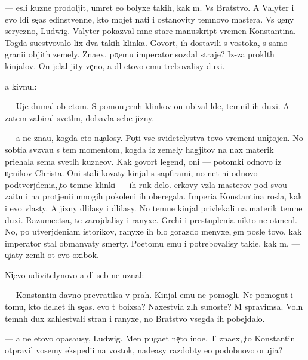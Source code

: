 \documentclass[10pt]{book}
\begin{document}
— {\Y}esli kuzne{\q} prodoljit, umret {\y}e{\x}o bolyxe takih, kak m{\yi}. Vs{\e} Bratstvo. A Valyter i {\y}evo l{\iu}di se{\y}{\c}as {\y}edinstvenn{\yi}{\y}e, kto mojet na{\y}ti i ostanovity temnovo mastera. Vs{\e} o{\c}eny seryezno, Ludwig. Valyter pokaz{\yi}val mne star{\yi}{\y}e manuskript{\yi} vremen Konstantina. Togda su{\x}estvovalo lix dva takih klinka. Govor{\ia}t, ih dostavili s vostoka, s samo{\y} grani{\q}i objit{\yi}h zemely. Zna{\y}ex, po{\c}emu imperator sozdal straje{\y}? Iz-za prokl{\ia}t{\yi}h kinjalov. On jelal jity ve{\c}no, a dl{\ia} etovo {\y}emu trebovalisy duxi.

{\Y}a kivnul:

— Uje dumal ob etom. S pomo{\x}{\y}u {\c}ern{\yi}h klinkov on ubival l{\iu}de{\y}, temnil ih duxi. A zatem zabiral svetl{\yi}m, dobavl{\ia}{\y}a sebe jizny.

— {\Y}a ne zna{\y}u, kogda eto na{\c}alosy. Po{\c}ti vse svidetelystva tovo vremeni uni{\c}tojen{\yi}. No sob{\yi}ti{\y}a sv{\ia}z{\yi}va{\y}u s tem momentom, kogda iz zemely hagjitov na nax materik pri{\y}ehala sem{\y}a svetl{\yi}h kuzne{\q}ov. Kak govor{\ia}t legend{\yi}, oni — potomki odnovo iz u{\c}enikov Christa. Oni stali kovaty kinjal{\yi} s sapfirami, no net ni odnovo podtverjdeni{\y}a, {\c}to temn{\yi}{\y}e klinki — ih ruk delo. {\Q}erkovy vz{\ia}la masterov pod svo{\y}u za{\x}itu i na prot{\ia}jeni{\y}i mnogih pokoleni{\y} ih oberegala. Imperi{\y}a Konstantina rosla, kak i {\y}evo vlasty. A jizny dlilasy i dlilasy. No temn{\yi}{\y}e kinjal{\yi} privlekali na materik temn{\yi}{\y}e duxi. Razume{\y}etsa, te zarojdalisy i ranyxe. Grehi i prestupleni{\y}a nikto ne otmen{\ia}l. No, po utverjdeni{\y}am istorikov, ranyxe ih b{\yi}lo gorazdo menyxe, {\c}em posle tovo, kak imperator stal obman{\yi}vaty smerty. Poetomu {\y}emu i potrebovalisy taki{\y}e, kak m{\yi}, — o{\c}i{\x}aty zemli ot {\y}evo oxibok.

Ni{\c}evo udivitelynovo {\y}a dl{\ia} seb{\ia} ne uznal:

— Konstantin davno prevratilsa v prah. Kinjal{\yi} {\y}emu ne pomogli. Ne pomogut i tomu, kto dela{\y}et ih se{\y}{\c}as. {\C}evo t{\yi} bo{\y}ixsa? Naxestvi{\y}a zl{\yi}h su{\x}noste{\y}? M{\yi} spravimsa. Voln{\yi} temn{\yi}h dux zahlest{\yi}vali stran{\yi} i ranyxe, no Bratstvo vsegda ih pobejdalo.

— {\Y}a ne etovo opasa{\y}usy, Ludwig. Men{\ia} puga{\y}et ne{\c}to ino{\y}e. T{\yi} zna{\y}ex, {\c}to Konstantin otpravil vosemy ekspedi{\q}i{\y} na vostok, nade{\y}asy razdob{\yi}ty {\y}e{\x}o podobnovo oruji{\y}a?
\end{document}
